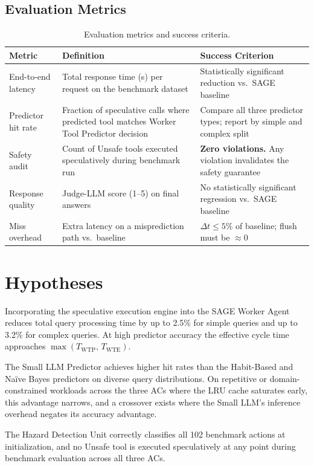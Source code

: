 \documentclass[conference]{IEEEtran}
\newcommand{\twtp}{T_{\mathrm{WTP}}}   %
\newcommand{\twte}{T_{\mathrm{WTE}}}   %
\begin{document}
\subsection{Evaluation Metrics}
\label{sec:metrics}
\begin{table}[H]
\centering
\caption{Evaluation metrics and success criteria.}
\label{tab:metrics}
\renewcommand{\arraystretch}{1.3}
\begin{tabularx}{\columnwidth}{p{1.9cm} X X}
\toprule
\rowcolor{navy}
\color{white}\textbf{Metric} &
\color{white}\textbf{Definition} &
\color{white}\textbf{Success Criterion} \\
\midrule
End-to-end latency
& Total response time (s) per request on the benchmark dataset
& Statistically significant reduction vs.\ SAGE baseline \\
\rowcolor{rowgray}
Predictor hit rate
& Fraction of speculative calls where predicted tool matches Worker Tool
  Predictor decision
& Compare all three predictor types; report by simple and complex split \\
Safety audit
& Count of Unsafe tools executed speculatively during benchmark run
& \textbf{Zero violations.} Any violation invalidates the safety guarantee \\
\rowcolor{rowgray}
Response quality
& Judge-LLM score (1--5) on final answers
& No statistically significant regression vs.\ SAGE baseline \\
Miss overhead
& Extra latency on a misprediction path vs.\ baseline
& $\Delta t \leq 5\%$ of baseline; flush must be ${\approx}0$ \\
\bottomrule
\end{tabularx}
\end{table}

\section{Hypotheses}
\begin{description}[leftmargin=0pt, itemsep=6pt]
\item[\textbf{H1--Latency Reduction.}]
Incorporating the speculative execution engine into the SAGE Worker Agent
reduces total query processing time by up to 2.5\% for simple queries and up
to 3.2\% for complex queries.
At high predictor accuracy the effective cycle time approaches
$\max(\twtp,\, \twte)$.
\item[\textbf{H2--Predictor Tradeoff.}]
The Small LLM Predictor achieves higher hit rates than the Habit-Based and
Na\"{i}ve Bayes predictors on diverse query distributions.
On repetitive or domain-constrained workloads across the three ACs where the
LRU cache saturates early, this advantage narrows, and a crossover exists where
the Small LLM's inference overhead negates its accuracy advantage.
\item[\textbf{H3--Safety Soundness.}]
The Hazard Detection Unit correctly classifies all 102 benchmark actions at
initialization, and no Unsafe tool is executed speculatively at any point
during benchmark evaluation across all three ACs.
\end{description}
\end{document}
